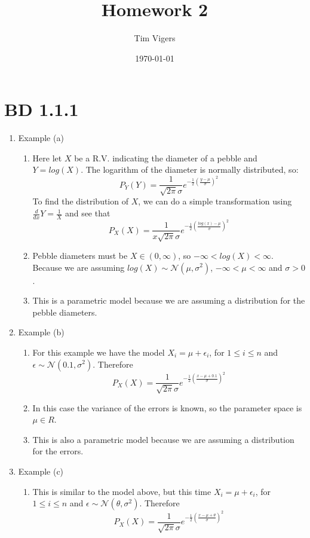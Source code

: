 \documentclass[a4paper,12pt]{article}
\begin{document}
\title{Homework 2}
\author{Tim Vigers}
\date{\today}
\maketitle

\section{BD 1.1.1}
\begin{enumerate}
  \item Example (a)
  \begin{enumerate}
     \item Here let $X$ be a R.V. indicating the diameter of a pebble and $Y=log(X)$. The logarithm of the diameter is normally distributed, so: $$P_Y(Y)=\frac{1}{\sqrt{2\pi}\sigma}e^{-\frac{1}{2}(\frac{y-\mu}{\sigma})^2}$$
     To find the distribution of $X$, we can do a simple transformation using $\frac{d}{dx}Y=\frac{1}{X}$ and see that $$P_X(X)=\frac{1}{x\sqrt{2\pi}\sigma}e^{-\frac{1}{2}(\frac{log(x)-\mu}{\sigma})^2}$$
     \item Pebble diameters must be $X\in (0,\infty)$, so $-\infty<log(X)<\infty$. Because we are assuming $log(X)\sim \mathcal{N}(\mu,\sigma^2)$, $-\infty<\mu<\infty$ and $\sigma>0$.
     \item This is a parametric model because we are assuming a distribution for the pebble diameters.
   \end{enumerate}
  \item Example (b)
  \begin{enumerate}
     \item For this example we have the model $X_i=\mu+\epsilon_i$, for $1\leq i \leq n$ and $\epsilon\sim \mathcal{N}(0.1,\sigma^2)$. Therefore $$P_X(X)=\frac{1}{\sqrt{2\pi}\sigma}e^{-\frac{1}{2}(\frac{x-\mu+0.1}{\sigma})^2}$$
     \item In this case the variance of the errors is known, so the parameter space is $\mu\in R$.
     \item This is also a parametric model because we are assuming a distribution for the errors.
   \end{enumerate}
   \item Example (c)
   \begin{enumerate}
      \item This is similar to the model above, but this time $X_i=\mu+\epsilon_i$, for $1\leq i \leq n$ and $\epsilon\sim \mathcal{N}(\theta,\sigma^2)$. Therefore $$P_X(X)=\frac{1}{\sqrt{2\pi}\sigma}e^{-\frac{1}{2}(\frac{x-\mu+\theta}{\sigma})^2}$$

\end{enumerate}
\end{enumerate}
\end{document}
